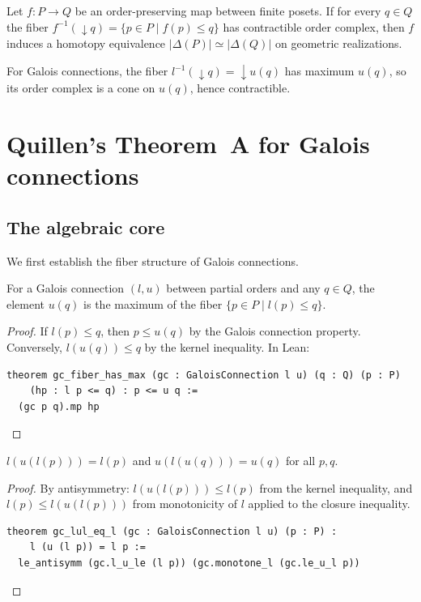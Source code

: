 \documentclass[11pt]{article}
\begin{document}
\begin{theorem}\label{thm:quillen-a}
Let $f : P \to Q$ be an order-preserving map between finite posets. If for
every $q \in Q$ the fiber $f^{-1}(\downarrow q) = \{p \in P \mid f(p) \le q\}$
has contractible order complex, then $f$ induces a homotopy equivalence
$|\Delta(P)| \simeq |\Delta(Q)|$ on geometric realizations.
\end{theorem}

For Galois connections, the fiber $l^{-1}(\downarrow q) = \downarrow u(q)$ has
maximum $u(q)$, so its order complex is a cone on $u(q)$, hence contractible.

\section{Quillen's Theorem~A for Galois connections}\label{sec:quillen}

\subsection{The algebraic core}

We first establish the fiber structure of Galois connections.

\begin{theorem}\label{thm:fiber-max}
For a Galois connection $(l, u)$ between partial orders and any $q \in Q$,
the element $u(q)$ is the maximum of the fiber
$\{p \in P \mid l(p) \le q\}$.
\end{theorem}

\begin{proof}
If $l(p) \le q$, then $p \le u(q)$ by the Galois connection property.
Conversely, $l(u(q)) \le q$ by the kernel inequality. In Lean:
\begin{lstlisting}
theorem gc_fiber_has_max (gc : GaloisConnection l u) (q : Q) (p : P)
    (hp : l p <= q) : p <= u q :=
  (gc p q).mp hp
\end{lstlisting}
\end{proof}

\begin{theorem}[Idempotence]\label{thm:idempotent}
$l(u(l(p))) = l(p)$ and $u(l(u(q))) = u(q)$ for all $p, q$.
\end{theorem}

\begin{proof}
By antisymmetry: $l(u(l(p))) \le l(p)$ from the kernel inequality, and
$l(p) \le l(u(l(p)))$ from monotonicity of $l$ applied to the closure
inequality.
\begin{lstlisting}
theorem gc_lul_eq_l (gc : GaloisConnection l u) (p : P) :
    l (u (l p)) = l p :=
  le_antisymm (gc.l_u_le (l p)) (gc.monotone_l (gc.le_u_l p))
\end{lstlisting}
\end{proof}
\end{document}
